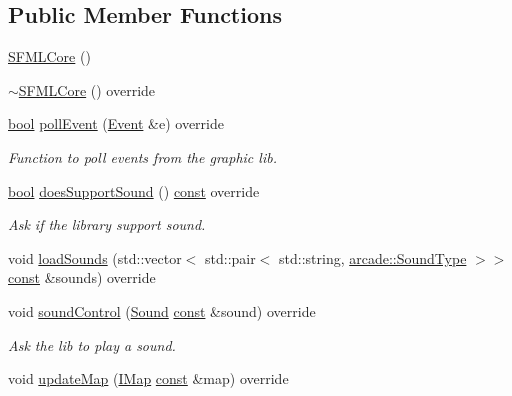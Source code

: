 \subsection*{Public Member Functions}
\begin{DoxyCompactItemize}
\item 
\hyperlink{classarcade_1_1_s_f_m_l_core_a4a28cd2f462bdff84880d8825be91a51}{S\-F\-M\-L\-Core} ()
\item 
\hyperlink{classarcade_1_1_s_f_m_l_core_a16b439a3c7c2c7bd23d1cf8df4637106}{$\sim$\-S\-F\-M\-L\-Core} () override
\item 
\hyperlink{term__entry_8h_a002004ba5d663f149f6c38064926abac}{bool} \hyperlink{classarcade_1_1_s_f_m_l_core_aa6fd1266021aee5f5b81ca8d7116a9da}{poll\-Event} (\hyperlink{structarcade_1_1_event}{Event} \&e) override
\begin{DoxyCompactList}\small\item\em Function to poll events from the graphic lib. \end{DoxyCompactList}\item 
\hyperlink{term__entry_8h_a002004ba5d663f149f6c38064926abac}{bool} \hyperlink{classarcade_1_1_s_f_m_l_core_a3bd154756e59aa923be6a967044010b8}{does\-Support\-Sound} () \hyperlink{term__entry_8h_a57bd63ce7f9a353488880e3de6692d5a}{const} override
\begin{DoxyCompactList}\small\item\em Ask if the library support sound. \end{DoxyCompactList}\item 
void \hyperlink{classarcade_1_1_s_f_m_l_core_a04f25330d6e19aa9374f77ec49463f7c}{load\-Sounds} (std\-::vector$<$ std\-::pair$<$ std\-::string, \hyperlink{namespacearcade_a3bb4743a2eea59f3927e404e6549cae5}{arcade\-::\-Sound\-Type} $>$$>$ \hyperlink{term__entry_8h_a57bd63ce7f9a353488880e3de6692d5a}{const} \&sounds) override
\item 
void \hyperlink{classarcade_1_1_s_f_m_l_core_ace78e5b9b783b1acd6e3512f9113a37e}{sound\-Control} (\hyperlink{structarcade_1_1_sound}{Sound} \hyperlink{term__entry_8h_a57bd63ce7f9a353488880e3de6692d5a}{const} \&sound) override
\begin{DoxyCompactList}\small\item\em Ask the lib to play a sound. \end{DoxyCompactList}\item 
void \hyperlink{classarcade_1_1_s_f_m_l_core_a455e14cf3f8eb326de84f2cfb85e3ac4}{update\-Map} (\hyperlink{classarcade_1_1_i_map}{I\-Map} \hyperlink{term__entry_8h_a57bd63ce7f9a353488880e3de6692d5a}{const} \&map) override
$$
\end{DoxyCompactItemize}
